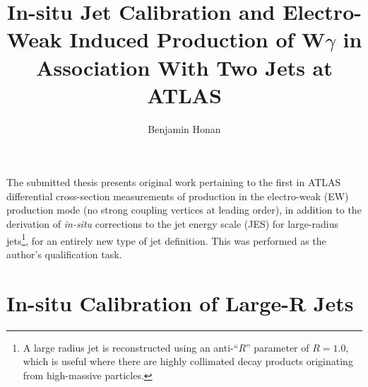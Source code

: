 \documentclass{thesissummary}
\begin{document}
\title{In-situ Jet Calibration and Electro-Weak Induced Production of W$\gamma$ in Association With Two Jets at ATLAS}

\author{ Benjamin Honan }

\address{School of Physics and Astronomy, University of Manchester, M13 9PL, United Kingdom}
\maketitle
\strut\newline
\noindent
The submitted thesis presents original work pertaining to the first in ATLAS differential cross-section measurements of \wyjj production in the electro-weak (EW) production mode (no strong coupling vertices at leading order), in addition to the derivation of \textit{in-situ} corrections to the jet energy scale (JES) for large-radius jets\footnote{A large radius jet is reconstructed using an anti-\kt ``$R$'' parameter of $R=1.0$, which is useful where there are highly collimated decay products originating from high-\pt massive particles.}, for an entirely new type of jet definition. This was performed as the author's qualification task.
\section{In-situ Calibration of Large-R Jets}
\end{document}
